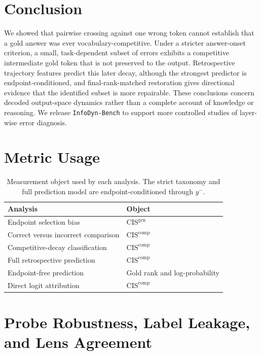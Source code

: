 \documentclass{article} %
\begin{document}
\section{Conclusion}

We showed that pairwise crossing against one wrong token cannot establish that a gold answer was ever vocabulary-competitive. Under a stricter answer-onset criterion, a small, task-dependent subset of errors exhibits a competitive intermediate gold token that is not preserved to the output. Retrospective trajectory features predict this later decay, although the strongest predictor is endpoint-conditioned, and final-rank-matched restoration gives directional evidence that the identified subset is more repairable. These conclusions concern decoded output-space dynamics rather than a complete account of knowledge or reasoning. We release \texttt{InfoDyn-Bench} to support more controlled studies of layer-wise error diagnosis.

\appendix

\section{Metric Usage}
\label{app:metric}

\begin{table}[h]
\centering
\caption{Measurement object used by each analysis. The strict taxonomy and full prediction model are endpoint-conditioned through $y^-$.}
\label{tab:metric}
\begin{tabular}{ll}
\toprule
\textbf{Analysis} & \textbf{Object} \\
\midrule
Endpoint selection bias & $\mathrm{CIS}^{\mathrm{gen}}$ \\
Correct versus incorrect comparison & $\mathrm{CIS}^{\mathrm{comp}}$ \\
Competitive-decay classification & $\mathrm{CIS}^{\mathrm{comp}}$ \\
Full retrospective prediction & $\mathrm{CIS}^{\mathrm{comp}}$ \\
Endpoint-free prediction & Gold rank and log-probability \\
Direct logit attribution & $\mathrm{CIS}^{\mathrm{comp}}$ \\
\bottomrule
\end{tabular}
\end{table}

\section{Probe Robustness, Label Leakage, and Lens Agreement}
\label{app:probe}
\end{document}
